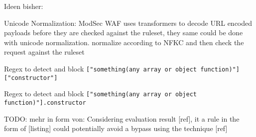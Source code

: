 	{\color{red}Ideen bisher:}

Unicode Normalization: ModSec WAF uses transformers to decode URL encoded payloads before they are checked against the ruleset, they same could be done with unicode normalization. normalize according to NFKC and then check the request against the ruleset

Regex to detect and block \verb|["something(any array or object function)"]["constructor"]|

Regex to detect and block \verb|["something(any array or object function)"].constructor|






{\color{red} TODO: mehr in form von: Considering evaluation result [ref], it a rule in the form of [listing] could potentially avoid a bypass using the technique [ref]}

